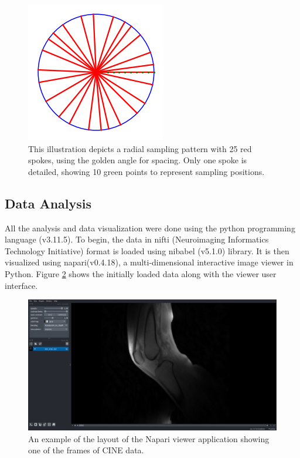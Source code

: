 \documentclass{micro-econ-thesis}
\begin{document}
\begin{figure}[H]
	\centering
	\includegraphics[width=0.7\linewidth]{kspace_depiction}
	\caption{This illustration depicts a radial sampling pattern with 25 red spokes, using the golden angle for spacing. Only one spoke is detailed, showing 10 green points to represent sampling positions.}
	\label{fig:kspacedepiction}
\end{figure}


\subsection{Data Analysis}
All the analysis and data visualization were done using the python programming language (v3.11.5). To begin, the data in nifti (Neuroimaging Informatics Technology Initiative) format is loaded using nibabel (v5.1.0) library. It is then visualized using napari(v0.4.18), a multi-dimensional interactive image viewer in Python. Figure \ref{fig:step1viewer} shows the initially loaded data along with the viewer user interface. 
\begin{figure}[H]
	\centering
	\includegraphics[width=0.7\linewidth]{step_1_viewer}
	\caption{An example of the layout of the Napari viewer application showing one of the frames of CINE data.}
	\label{fig:step1viewer}
\end{figure}
\end{document}
